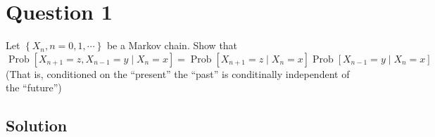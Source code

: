 \section*{Question 1}

Let \( \left \{ X_{n}, n=0,1, \cdots \right \} \) be a Markov chain.
Show that
\[
    \operatorname{Prob}\left[X_{n+1}=z, X_{n-1}=y \mid X_{n}=x\right]=\operatorname{Prob}\left[X_{n+1}=z \mid X_{n}=x\right] \operatorname{Prob}\left[X_{n-1}=y \mid X_{n}=x\right]
\]
(That is, conditioned on the ``present'' the ``past'' is conditinally independent of the ``future'')

\subsection*{Solution}

